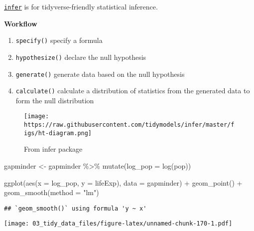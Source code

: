 \documentclass[
]{book}
\newenvironment{Shaded}{\begin{snugshade}}{\end{snugshade}}
\newcommand{\AttributeTok}[1]{\textcolor[rgb]{0.77,0.63,0.00}{#1}}
\newcommand{\FunctionTok}[1]{\textcolor[rgb]{0.00,0.00,0.00}{#1}}
\newcommand{\NormalTok}[1]{#1}
\newcommand{\OtherTok}[1]{\textcolor[rgb]{0.56,0.35,0.01}{#1}}
\newcommand{\SpecialCharTok}[1]{\textcolor[rgb]{0.00,0.00,0.00}{#1}}
\newcommand{\StringTok}[1]{\textcolor[rgb]{0.31,0.60,0.02}{#1}}
\providecommand{\tightlist}{%
  \setlength{\itemsep}{0pt}\setlength{\parskip}{0pt}}
\begin{document}
\href{https://github.com/tidymodels/infer}{\texttt{infer}} is for tidyverse-friendly statistical inference.

\textbf{Workflow}

\begin{enumerate}
\def\labelenumi{\arabic{enumi}.}
\tightlist
\item
  \texttt{specify()} specify a formula
\item
  \texttt{hypothesize()} declare the null hypothesis
\item
  \texttt{generate()} generate data based on the null hypothesis
\item
  \texttt{calculate()} calculate a distribution of statistics from the generated data to form the null distribution
\end{enumerate}

\begin{figure}
\centering
\texttt{[image: https://raw.githubusercontent.com/tidymodels/infer/master/figs/ht-diagram.png]}
\caption{From infer package}
\end{figure}

\begin{Shaded}
\begin{Highlighting}[]
\NormalTok{gapminder }\OtherTok{\textless{}{-}}\NormalTok{ gapminder }\SpecialCharTok{\%\textgreater{}\%}
  \FunctionTok{mutate}\NormalTok{(}\AttributeTok{log\_pop =} \FunctionTok{log}\NormalTok{(pop))}

\FunctionTok{ggplot}\NormalTok{(}\FunctionTok{aes}\NormalTok{(}\AttributeTok{x =}\NormalTok{ log\_pop, }\AttributeTok{y =}\NormalTok{ lifeExp), }\AttributeTok{data =}\NormalTok{ gapminder) }\SpecialCharTok{+}
  \FunctionTok{geom\_point}\NormalTok{() }\SpecialCharTok{+}
  \FunctionTok{geom\_smooth}\NormalTok{(}\AttributeTok{method =} \StringTok{"lm"}\NormalTok{)}
\end{Highlighting}
\end{Shaded}

\begin{verbatim}
## `geom_smooth()` using formula 'y ~ x'
\end{verbatim}

\texttt{[image: 03\_tidy\_data\_files/figure-latex/unnamed-chunk-170-1.pdf]}
\end{document}
